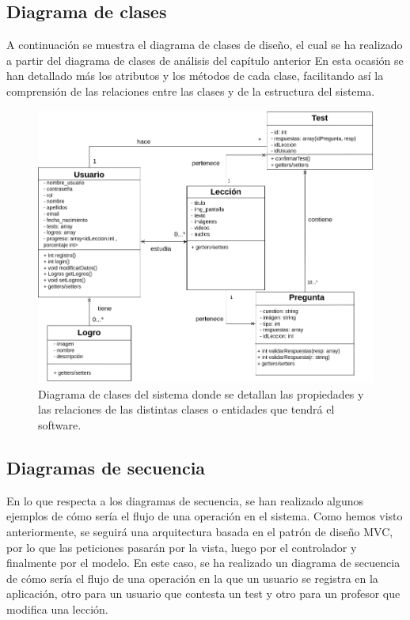\subsection{Diagrama de clases}
A continuación se muestra el diagrama de clases de diseño, el cual se ha realizado a partir del diagrama de clases de análisis del capítulo anterior En esta ocasión se han detallado más
los atributos y los métodos de cada clase, facilitando así la comprensión de las relaciones entre las clases y de la estructura del sistema.
\begin{figure}[H]
    \centering
    \centerline{\includegraphics[width=\textwidth]{imagenes/c6/diagramadeclases.png}}
    \caption{Diagrama de clases del sistema donde se detallan las propiedades y las relaciones de las distintas clases o entidades que tendrá el software.}
    \label{fig:diagramadearquitectura}    
\end{figure}

\subsection{Diagramas de secuencia}
En lo que respecta a los diagramas de secuencia, se han realizado algunos ejemplos de cómo sería el flujo de una operación en el sistema. Como hemos visto anteriormente,
se seguirá una arquitectura basada en el patrón de diseño MVC, por lo que las peticiones pasarán por la vista, luego por el controlador y finalmente por el modelo.
En este caso, se ha realizado un diagrama de secuencia de cómo sería el flujo de una operación en la que un usuario se registra en la aplicación, otro para un usuario que contesta un test y otro
para un profesor que modifica una lección.

